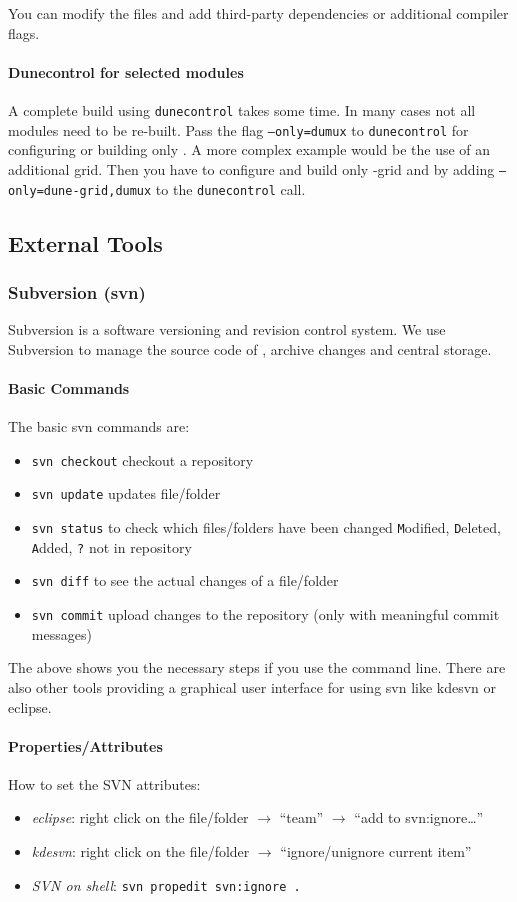 You can modify the files and add third-party dependencies or additional compiler flags.

\paragraph{Dunecontrol for selected modules}
A complete build using \texttt{dunecontrol} takes some time. In many cases not all modules need to be re-built.
Pass the flag \texttt{--only=dumux} to \texttt{dunecontrol} for configuring or building only \Dumux. A more
complex example would be the use of an additional grid. Then you have to configure and build only \Dune{}-grid
and \Dumux by adding \texttt{--only=dune-grid,dumux} to the \texttt{dunecontrol} call.

\subsection{External Tools}
\subsubsection{Subversion (svn)}

Subversion is a software versioning and revision control system. We use Subversion to manage the source code
of \Dumux, archive changes and central storage.

\paragraph{Basic Commands}
The basic svn commands are:
\begin{itemize}
  \item \texttt{svn checkout} checkout a repository
  \item \texttt{svn update} updates file/folder
  \item \texttt{svn status} to check which files/folders have been changed
        \texttt{M}odified, \texttt{D}eleted, \texttt{A}dded, \texttt{?} not in repository
  \item \texttt{svn diff} to see the actual changes of a file/folder
  \item \texttt{svn commit} upload changes to the repository (only with meaningful
        commit messages)
\end{itemize}
The above shows you the necessary steps if you use the command line. There are also other tools providing a graphical
user interface for using svn like kdesvn or eclipse.

\paragraph{Properties/Attributes}
How to set the SVN attributes:
\begin{itemize}
 \item{\em eclipse}: right click on the file/folder $\rightarrow$ ``team''
        $\rightarrow$ ``add to svn:ignore\dots''
 \item{\em kdesvn}: right click on the file/folder $\rightarrow$ ``ignore/unignore
        current item''
 \item{\em SVN on shell}: \verb+svn propedit svn:ignore .+
\end{itemize}

